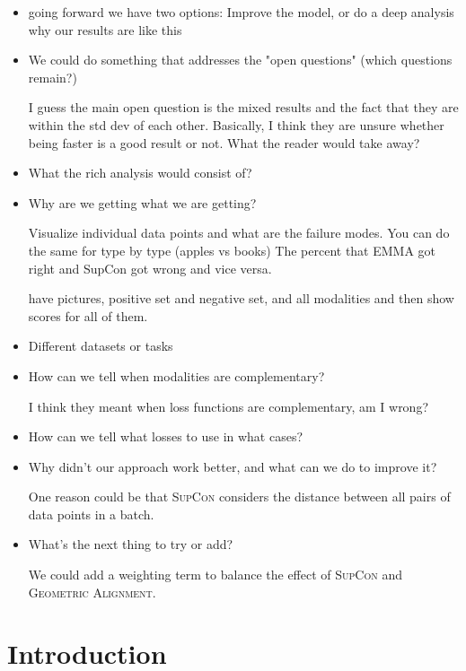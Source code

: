 \documentclass[10pt]{article} %
\newcommand{\TD}[1]{{\color{red}{\textbf{TODO}}} #1}
\newcommand{\DO}[1]{{\color{blue}{\textbf{PROG}}} #1}
\newcommand{\geom}{\textsc{Geometric Alignment}}
\newcommand{\supcon}{\textsc{SupCon}}
\begin{document}
\begin{itemize}
    \item going forward we have two options: Improve the model, or do a deep analysis why our results are like this
    
    \item We could do something that addresses the "open questions" (which questions remain?)

    I guess the main open question is the mixed results and the fact that they are within the std dev of each other. Basically, I think they are unsure whether being faster is a good result or not.
    What the reader would take away?
    
    \item \DO What the rich analysis would consist of?

    \item Why are we getting what we are getting?
    
    Visualize individual data points and what are the failure modes.
    You can do the same for type by type (apples vs books)
    The percent that EMMA got right and SupCon got wrong and vice versa.

    have pictures, positive set and negative set,
    and all modalities and then show scores for all of them.
    
    \item \TD Different datasets or tasks
    \item \TD How can we tell when modalities are complementary?

    I think they meant when loss functions are complementary, am I wrong?
    
    \item \TD How can we tell what losses to use in what cases?
    
    \item  \TD Why didn't our approach work better, and what can we do to improve it?
    
    One reason could be that \supcon{} considers the distance between all pairs of data points in a batch.
    
    \item What's the next thing to try or add?
    
    We could add a weighting term to balance the effect of \supcon{} and \geom{}.
    
\end{itemize}


\section{Introduction}
\label{intro}
\end{document}
